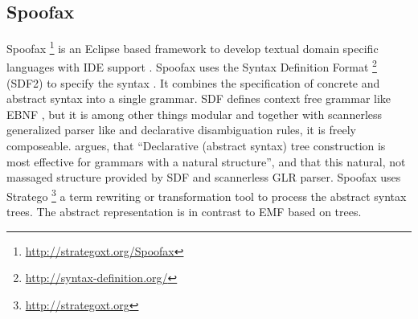 \subsection{Spoofax}
Spoofax \footnote{\raggedright \url{http://strategoxt.org/Spoofax}} is an Eclipse based framework to develop textual domain specific languages with IDE support \cite{Spoofax}. Spoofax uses the Syntax Definition Format \footnote{\raggedright \url{http://syntax-definition.org/}} (SDF2) to specify the syntax \cite{Spoofax}. It combines the specification of concrete and abstract syntax into a single grammar. SDF defines context free grammar like EBNF \cite{sdf}, but it is among other things modular and together with scannerless generalized parser like \cite{sglr} and declarative disambiguation rules, it is freely composeable.  \cite{bible} argues, that ``Declarative (abstract syntax) tree construction is most effective for grammars with a natural structure'', and that this natural, not massaged structure provided by SDF and scannerless GLR parser. Spoofax uses Stratego \footnote{\raggedright \url{http://strategoxt.org}} a term rewriting or transformation tool \cite{stratego} to process the abstract syntax trees. The abstract representation is in contrast to EMF based on trees.






